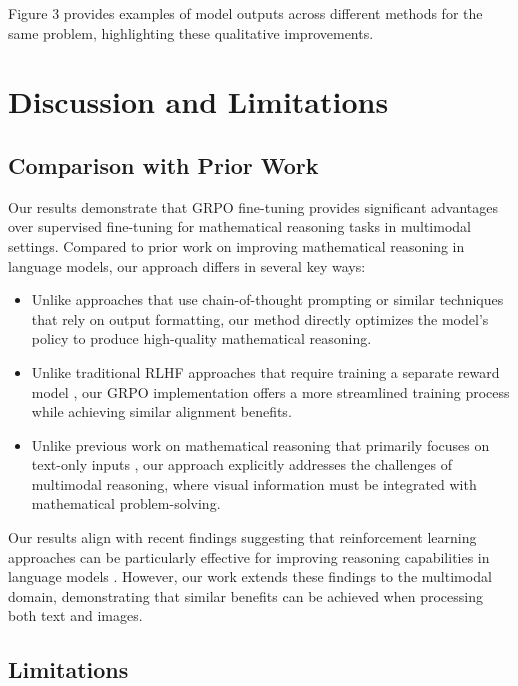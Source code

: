 \documentclass[11pt,a4paper]{article}
\begin{document}
Figure 3 provides examples of model outputs across different methods for the same problem, highlighting these qualitative improvements.


\section{Discussion and Limitations}

\subsection{Comparison with Prior Work}

Our results demonstrate that GRPO fine-tuning provides significant advantages over supervised fine-tuning for mathematical reasoning tasks in multimodal settings. Compared to prior work on improving mathematical reasoning in language models, our approach differs in several key ways:

\begin{itemize}
    \item Unlike approaches that use chain-of-thought prompting \cite{wei2022chain} or similar techniques that rely on output formatting, our method directly optimizes the model's policy to produce high-quality mathematical reasoning.
    \item Unlike traditional RLHF approaches that require training a separate reward model \cite{ouyang2022training}, our GRPO implementation offers a more streamlined training process while achieving similar alignment benefits.
    \item Unlike previous work on mathematical reasoning that primarily focuses on text-only inputs \cite{cobbe2021training, lewkowycz2022solving}, our approach explicitly addresses the challenges of multimodal reasoning, where visual information must be integrated with mathematical problem-solving.
\end{itemize}

Our results align with recent findings suggesting that reinforcement learning approaches can be particularly effective for improving reasoning capabilities in language models \cite{bai2022constitutional, azar2023general}. However, our work extends these findings to the multimodal domain, demonstrating that similar benefits can be achieved when processing both text and images.

\subsection{Limitations}
\end{document}
